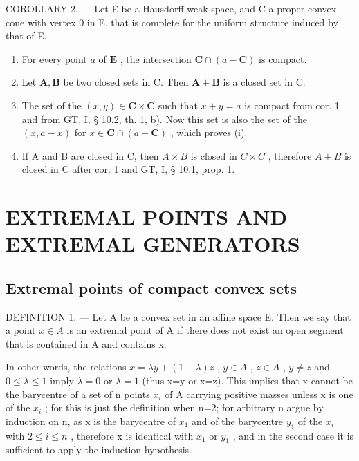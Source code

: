 COROLLARY 2. --- Let E be a Hausdorff weak space, and C a proper convex cone with vertex 0 in E, that is complete for the uniform structure induced by that of E.

\begin{enumerate}
\def\labelenumi{(\roman{enumi})}
\item
  For every point \(a\) of \(\mathbf{E}\) , the intersection \(\mathbf{C} \cap (a - \mathbf{C})\) is compact.
\item
  Let \(\mathbf{A},\mathbf{B}\) be two closed sets in C. Then \(\mathbf{A} + \mathbf{B}\) is a closed set in C.
\item
  The set of the \((x, y) \in \mathbf{C} \times \mathbf{C}\) such that \(x + y = a\) is compact from cor. 1 and from GT, I, § 10.2, th. 1, b). Now this set is also the set of the \((x, a - x)\) for \(x \in \mathbf{C} \cap (a - \mathbf{C})\) , which proves (i).
\item
  If A and B are closed in C, then \(A \times B\) is closed in \(C \times C\) , therefore \(A + B\) is closed in C after cor. 1 and GT, I, § 10.1, prop. 1.
\end{enumerate}

\section{EXTREMAL POINTS AND EXTREMAL GENERATORS}

\subsection{Extremal points of compact convex sets}

DEFINITION 1. --- Let A be a convex set in an affine space E. Then we say that a point \(x \in A\) is an extremal point of A if there does not exist an open segment that is contained in A and contains x.

In other words, the relations \(x=\lambda y+(1-\lambda)z\) , \(y\in A\) , \(z\in A\) , \(y\neq z\) and \(0\leqslant\lambda\leqslant1\) imply \(\lambda=0\) or \(\lambda=1\) (thus x=y or x=z). This implies that x cannot be the barycentre of a set of n points \(x_{i}\) of A carrying positive masses unless x is one of the \(x_{i}\) ; for this is just the definition when n=2; for arbitrary n argue by induction on n, as x is the barycentre of \(x_{1}\) and of the barycentre \(y_{1}\) of the \(x_{i}\) with \(2\leqslant i\leqslant n\) , therefore x is identical with \(x_{1}\) or \(y_{1}\) , and in the second case it is sufficient to apply the induction hypothesis.

